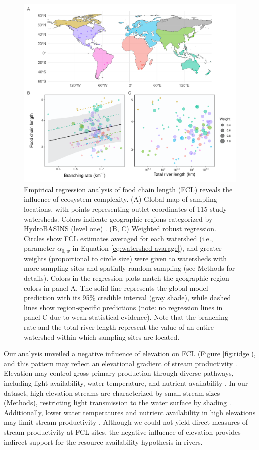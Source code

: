 \documentclass[11pt, class=article, crop=false]{standalone}
\begin{document}
\begin{figure}
    \centering
    \includegraphics[width=0.9\linewidth]{output/fig_emp_fcl.pdf}
    \caption{Empirical regression analysis of food chain length (FCL) reveals the influence of ecosystem complexity. (A) Global map of sampling locations, with points representing outlet coordinates of 115 study watersheds. Colors indicate geographic regions categorized by HydroBASINS (level one) \citep{lehner_global_2013}. (B, C) Weighted robust regression. Circles show FCL estimates averaged for each watershed (i.e., parameter $\alpha_{0,w}$ in Equation \ref{eq:watershed-avarage}), and greater weights (proportional to circle size) were given to watersheds with more sampling sites and spatially random sampling (see Methods for details). Colors in the regression plots match the geographic region colors in panel A. The solid line represents the global model prediction with its 95\% credible interval (gray shade), while dashed lines show region-specific predictions (note: no regression lines in panel C due to weak statistical evidence). Note that the branching rate and the total river length represent the value of an entire watershed within which sampling sites are located.}
    \label{fig:fcl-obs}
\end{figure}

\noindent\makebox[\linewidth]{\rule{\textwidth}{0.4pt}}

Our analysis unveiled a negative influence of elevation on FCL (Figure \ref{fig:ridge}), and this pattern may reflect an elevational gradient of stream productivity \citep{marzolf_ecosystem_2021}.
Elevation may control gross primary production through diverse pathways, including light availability, water temperature, and nutrient availability \citep{marzolf_ecosystem_2021, atkinson_determinants_2018}.
In our dataset, high-elevation streams are characterized by small stream sizes (Methods), restricting light transmission to the water surface by shading \citep{finlay_light-mediated_2011, finlay_human_2013, bernhardt_light_2022}.
Additionally, lower water temperatures and nutrient availability in high elevations may limit stream productivity \citep{demars_temperature_2011}.
Although we could not yield direct measures of stream productivity at FCL sites, the negative influence of elevation provides indirect support for the resource availability hypothesis in rivers.
\end{document}
